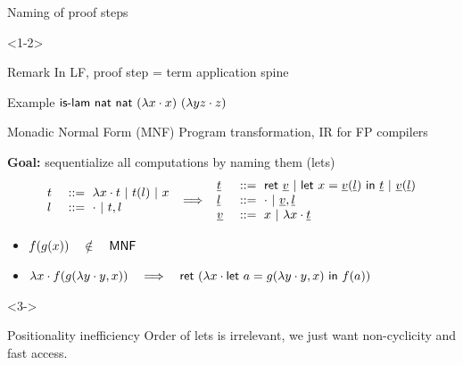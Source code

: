 \documentclass[ignorenonframetext,red]{beamer}
\begin{document}
\begin{frame}{Naming of proof steps}
  \begin{onlyenv}<1-2>
    \begin{block}{Remark}
      In LF, proof step = term application spine

      \textcolor{green!50!black}{Example} $ \text{\textsf{is-lam}}\
      \mathsf{nat}\ \mathsf{nat}\ (\lambda{x}\cdot x)\ (\lambda{y z}\cdot z) $
    \end{block}
    \pause
    \begin{block}{Monadic Normal Form (\textsf{MNF})}
      Program transformation, IR for FP compilers

      \textbf{Goal:} sequentialize all computations by naming them
      (\textsf{let}s)
      \[
      \inXLF
      \begin{array}{ll}
        \mo &\gequal \ulam\mv\mo \gor \lapp\mo\ma \gor \mv \\
        \ma &\gequal \lnil \gor \lcons\mo\ma \\
      \end{array}
      \ \Longrightarrow\ \inXLFa
      \begin{array}{ll}
        \mo &\gequal \ret\mval \gor \letb\mv{\lapp\mval\ma}\mo \gor \lapp\mval\ma \\
        \ma &\gequal \lnil \gor \lcons\mval\ma \\
        \mval &\gequal \mv \gor \ulam\mv\mo
      \end{array}
      \]
      \begin{examples}
        \begin{itemize}
        \item $\inXLFa \lapp f {\lapp g {\lsing x}} \quad\notin\quad
          \mathsf{MNF}$
        \item $\lambda{x}\cdot {f}({{{g}({{\lambda{y}\cdot
                  y},{{x}}})}}) \quad\Longrightarrow\quad
          \textsf{ret}\ {(\lambda{x}\cdot \mathsf{let}\ {a}={{{g}({{\lambda{y}\cdot y},{{x}}})}}\ \mathsf{in}\  {f}({{a}}))} $
        \end{itemize}
      \end{examples}
    \end{block}
  \end{onlyenv}
  \begin{onlyenv}<3->
    \begin{block}{Positionality inefficiency}
      Order of \textsf{let}s is irrelevant, we just want
      non-cyclicity and fast access.
      \inXLFa
      \[
      \begin{array}{l}

\end{array}\]
\end{block}
\end{onlyenv}
\end{frame}
\end{document}
